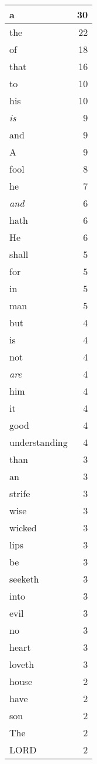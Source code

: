 \begin{center}
\begin{longtable}{l|r}
a & 30\\ \hline 
the & 22\\ \hline 
of & 18\\ \hline 
that & 16\\ \hline 
to & 10\\ \hline 
his & 10\\ \hline 
\emph{is} & 9\\ \hline 
and & 9\\ \hline 
A & 9\\ \hline 
fool & 8\\ \hline 
he & 7\\ \hline 
\emph{and} & 6\\ \hline 
hath & 6\\ \hline 
He & 6\\ \hline 
shall & 5\\ \hline 
for & 5\\ \hline 
in & 5\\ \hline 
man & 5\\ \hline 
but & 4\\ \hline 
is & 4\\ \hline 
not & 4\\ \hline 
\emph{are} & 4\\ \hline 
him & 4\\ \hline 
it & 4\\ \hline 
good & 4\\ \hline 
understanding & 4\\ \hline 
than & 3\\ \hline 
an & 3\\ \hline 
strife & 3\\ \hline 
wise & 3\\ \hline 
wicked & 3\\ \hline 
lips & 3\\ \hline 
be & 3\\ \hline 
seeketh & 3\\ \hline 
into & 3\\ \hline 
evil & 3\\ \hline 
no & 3\\ \hline 
heart & 3\\ \hline 
loveth & 3\\ \hline 
house & 2\\ \hline 
have & 2\\ \hline 
son & 2\\ \hline 
The & 2\\ \hline 
LORD & 2\\ \hline 

\end{longtable}
\end{center}
